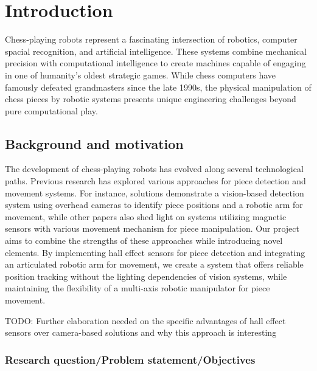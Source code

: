 
\chapter{Introduction}
\label{chap:intro}

Chess-playing robots represent a fascinating intersection of robotics, computer spacial recognition, and artificial intelligence. These systems combine mechanical precision with computational intelligence to create machines capable of engaging in one of humanity's oldest strategic games. While chess computers have famously defeated grandmasters since the late 1990s, the physical manipulation of chess pieces by robotic systems presents unique engineering challenges beyond pure computational play.

\section{Background and motivation}
\label{sec:background-motivation}

The development of chess-playing robots has evolved along several technological paths. Previous research has explored various approaches for piece detection and movement systems. For instance, solutions demonstrate a vision-based detection system using overhead cameras to identify piece positions and a robotic arm for movement, while other papers also shed light on systems utilizing magnetic sensors with various movement mechanism for piece manipulation.
Our project aims to combine the strengths of these approaches while introducing novel elements. By implementing hall effect sensors for piece detection and integrating an articulated robotic arm for movement, we create a system that offers reliable position tracking without the lighting dependencies of vision systems, while maintaining the flexibility of a multi-axis robotic manipulator for piece movement.

TODO: Further elaboration needed on the specific advantages of hall effect sensors over camera-based solutions and why this approach is interesting

\subsection{Research question/Problem statement/Objectives}
\label{sec:research-question}

